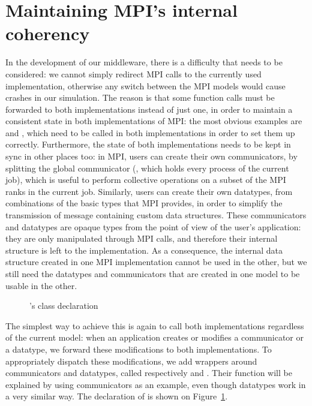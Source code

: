 \section{Maintaining MPI's internal coherency}
\label{sec:6_model_change:coherency}

In the development of our middleware, there is a difficulty that needs to be
considered: we cannot simply redirect MPI calls to the currently used
implementation, otherwise any switch between the MPI models would cause crashes
in our simulation. The reason is that some function calls must be forwarded to
both implementations instead of just one, in order to maintain a consistent
state in both implementations of MPI: the most obvious examples are
 and , which need to be called in both
implementations in order to set them up correctly. Furthermore, the state of
both implementations needs to be kept in sync in other places too: in MPI, users
can create their own communicators, by splitting the global communicator
(, which holds every process of the current job), which
is useful to perform collective operations on a subset of the MPI ranks in the
current job. Similarly, users can create their own datatypes, from combinations
of the basic types that MPI provides, in order to simplify the transmission of
message containing custom data structures. These communicators and datatypes are
opaque types from the point of view of the user's application: they are only
manipulated through MPI calls, and therefore their internal structure is left to
the implementation. As a consequence, the internal data structure created in one
MPI implementation cannot be used in the other, but we still need the datatypes
and communicators that are created in one model to be usable in the other.

\begin{figure}[!b]
    
    \caption{'s class declaration}
    \label{fig:6_model_change:BxiMpiComm}
\end{figure}

The simplest way to achieve this is again to call both implementations
regardless of the current model: when an application creates or modifies a
communicator or a datatype, we forward these modifications to both
implementations. To appropriately dispatch these modifications, we add wrappers
around communicators and datatypes, called respectively  and
. Their function will be explained by using communicators
as an example, even though datatypes work in a very similar way. The declaration
of  is shown on Figure~\ref{fig:6_model_change:BxiMpiComm}.

